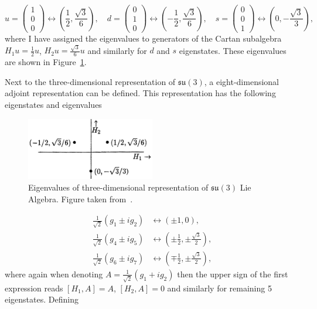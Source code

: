 \begin{equation}
  u = \begin{pmatrix} 1 \\ 0 \\ 0 \end{pmatrix} \leftrightarrow \left(
    \frac{1}{2}, \frac{\sqrt{3}}{6} \right), \quad
  d = \begin{pmatrix} 0 \\ 1 \\ 0 \end{pmatrix} \leftrightarrow \left(
    - \frac{1}{2}, \frac{\sqrt{3}}{6} \right), \quad
  s = \begin{pmatrix} 0 \\ 0 \\ 1 \end{pmatrix} \leftrightarrow \left(
    0, - \frac{\sqrt{3}}{3} \right), \quad
  \label{eq:RepresentLie3}
\end{equation}
where I have assigned the eigenvalues to generators of the Cartan subalgebra 
$H_1 u = \frac{1}{2} u$, $H_2 u = \frac{\sqrt{3}}{6} u$ and similarly
for $d$ and $s$ eigenstates. 
These eigenvalues are shown in Figure~\ref{fig:QuarkTriplet}. 

Next to the three-dimensional representation of $\mathfrak{su}(3)$, a
eight-dimensional adjoint representation can be defined.
This representation has the following eigenstates and eigenvalues

\begin{figure}
  \centering
  \includegraphics[width=0.5\textwidth]{Chapter1/Quark-triplet.png} 
  \caption[Eigenvalues of three-dimensional representation of $\mathfrak{su}(3)$
          Lie Algebra.]
          {Eigenvalues of three-dimensional representation of $\mathfrak{su}(3)$ Lie
          Algebra. Figure taken from~\cite{LieAlgebrasForParticlePhysicists}.}
  \label{fig:QuarkTriplet}
\end{figure}

\begin{align}
  \frac{1}{\sqrt{2}} \left( g_1 \pm i g_2  \right)
    &\leftrightarrow \left( \pm 1, 0 \right), \nonumber \\
  \frac{1}{\sqrt{2}} \left( g_4 \pm i g_5 \right) 
    &\leftrightarrow \left( \pm \frac{1}{2}, \pm \frac{\sqrt{3}}{2} \right), 
    \label{eq:RepresentLie8} \\
  \frac{1}{\sqrt{2}} \left( g_6 \pm i g_7 \right) 
    &\leftrightarrow \left( \mp \frac{1}{2}, \pm \frac{\sqrt{3}}{2} \right), \nonumber
\end{align}
where again when denoting $A = \frac{1}{\sqrt{2}} ( g_1 + i g_2 )$ then the
upper sign of the first expression reads $[ H_1, A ] = A$, $[ H_2, A ] = 0$ and
similarly for remaining 5 eigenstates. Defining 

